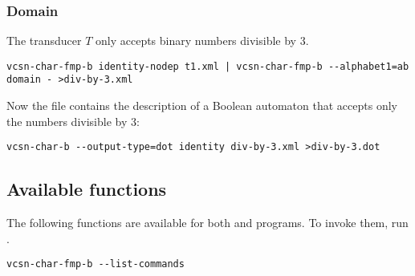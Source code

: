 \documentclass[a4paper]{report}
\newenvironment{shell}
{\begin{alltt}}
{\end{alltt}}
\newcommand{\taffn}[1]{\code{#1}}
\begin{document}
\subsubsection{Domain}
The transducer $T$ only accepts binary numbers divisible by 3.

\begin{verbatim}
vcsn-char-fmp-b identity-nodep t1.xml | vcsn-char-fmp-b --alphabet1=ab domain - >div-by-3.xml
\end{verbatim}

Now the file  contains the description of a
Boolean automaton that accepts only the numbers divisible by 3:

\begin{verbatim}
vcsn-char-b --output-type=dot identity div-by-3.xml >div-by-3.dot
\end{verbatim}



\subsection{Available functions}
The following functions are available for both 
and  programs.  To invoke them, run
.

\begin{verbatim}
vcsn-char-fmp-b --list-commands
\end{verbatim}
\end{document}
